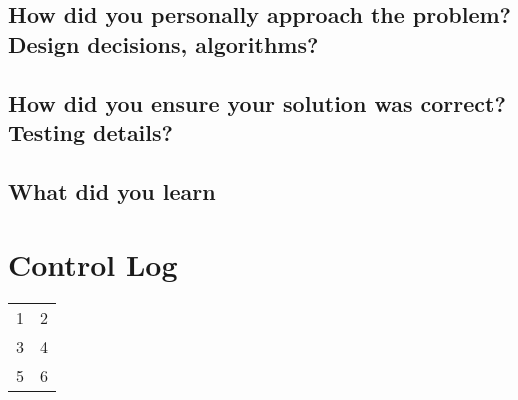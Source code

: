 \documentclass[onecolumn, 10pt, titlepage]{IEEEtran}
\begin{document}
\subsection*{How did you personally approach the problem? Design decisions, algorithms?}
\subsection*{How did you ensure your solution was correct? Testing details?}
\subsection*{What did you learn}

\section*{Control Log}
\begin{center}
	\begin{tabular}{ c c }
		1 & 2 \\
		3 & 4 \\
		5 & 6
	\end{tabular}
\end{center}
\end{document}
